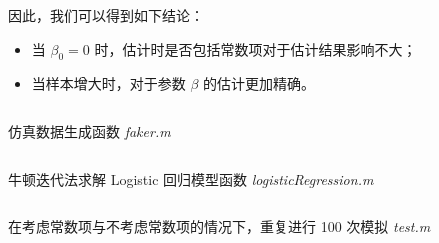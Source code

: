 \documentclass[cn,mtpro2,12pt]{elegantpaper}
\begin{document}
因此，我们可以得到如下结论：

\begin{itemize}
    \item 当 $\beta_{0}=0$ 时，估计时是否包括常数项对于估计结果影响不大；
    \item 当样本增大时，对于参数 $\beta$ 的估计更加精确。
\end{itemize}

\begin{listing}[htp]
    \inputminted{matlab}{faker.m}
    \caption{仿真数据生成函数 \textit{faker.m}}
\end{listing}
\begin{listing}[htp]
    \inputminted{matlab}{logisticRegression.m}
    \caption{牛顿迭代法求解 Logistic 回归模型函数 \textit{logisticRegression.m}}
\end{listing}
\begin{listing}[htp]
    \inputminted{matlab}{test.m}
    \caption{在考虑常数项与不考虑常数项的情况下，重复进行 100 次模拟 \textit{test.m}}
\end{listing}
\end{document}
